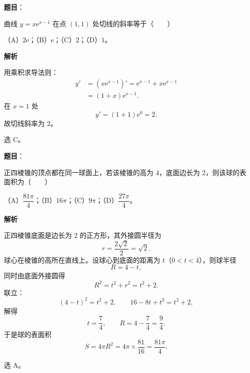 \begin{answer}

\textbf{题目}：

曲线 $y=x\mathrm e^{x-1}$ 在点 $(1,1)$ 处切线的斜率等于\mbox{（　　）}

（A）$2\mathrm e$；（B）$\mathrm e$；（C）$2$；（D）$1$。

\textbf{解析}

用乘积求导法则：
\nopagebreak[4]
\[\begin{aligned}
y'&=\left(x\mathrm e^{x-1}\right)'
=\mathrm e^{x-1}+x\mathrm e^{x-1}\\
&=(1+x)\mathrm e^{x-1}.
\end{aligned}\]
在 $x=1$ 处
\nopagebreak[4]
\[y'=(1+1)\mathrm e^{0}=2.\]
故切线斜率为 $2$。

选 C。


\end{answer}
\begin{answer}

\textbf{题目}：

正四棱锥的顶点都在同一球面上，若该棱锥的高为 $4$，底面边长为 $2$，则该球的表面积为\mbox{（　　）}

（A）$\dfrac{81\pi}{4}$；（B）$16\pi$；（C）$9\pi$；（D）$\dfrac{27\pi}{4}$。

\textbf{解析}

正四棱锥底面是边长为 $2$ 的正方形，其外接圆半径为
\nopagebreak[4]
\[r=\frac{2\sqrt2}{2}=\sqrt2.\]
球心在棱锥的高所在直线上。设球心到底面的距离为 $t$（$0<t<4$），则球半径
\nopagebreak[4]
\[R=4-t,\]
同时由底面外接圆得
\nopagebreak[4]
\[R^2=t^2+r^2=t^2+2.\]
联立：
\nopagebreak[4]
\[(4-t)^2=t^2+2,\qquad 16-8t+t^2=t^2+2,\]
解得
\nopagebreak[4]
\[t=\frac74,\qquad R=4-\frac74=\frac94.\]
于是球的表面积
\nopagebreak[4]
\[S=4\pi R^2=4\pi\times\frac{81}{16}=\frac{81\pi}{4}.\]

选 A。


\end{answer}

